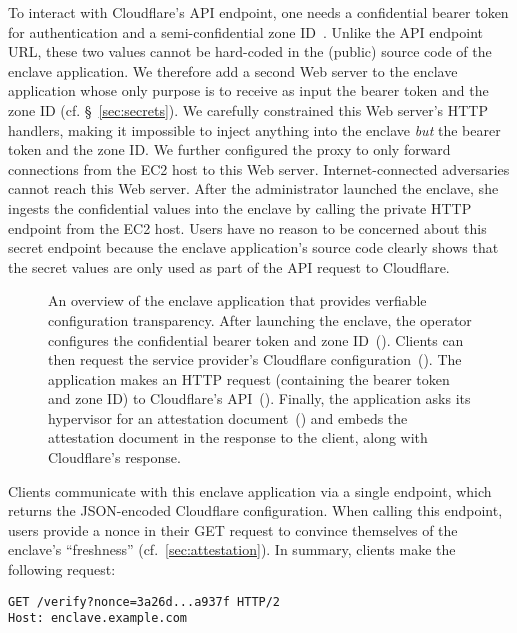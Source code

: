 To interact with Cloudflare's API endpoint, one needs a confidential bearer
token for authentication and a semi-confidential zone
ID~\cite{spectrum-config}.  Unlike the API endpoint URL, these two values
cannot be hard-coded in the (public) source code of the enclave application.
We therefore add a second Web server to the enclave application whose only
purpose is to receive as input the bearer token and the zone ID (cf.
\S~\ref{sec:secrets}).  We carefully constrained this Web server's HTTP
handlers, making it impossible to inject anything into the enclave \emph{but}
the bearer token and the zone ID.  We further configured the proxy to only
forward connections from the EC2 host to this Web server.  Internet-connected
adversaries cannot reach this Web server.  After the administrator launched the
enclave, she ingests the confidential values into the enclave by calling the
private HTTP endpoint from the EC2 host.  Users have no reason to be concerned
about this secret endpoint because the enclave application's source code
clearly shows that the secret values are only used as part of the API request
to Cloudflare.

\begin{figure}[t]
  \centering
  
  \caption{An overview of the enclave application that provides verfiable
  configuration transparency.  After launching the enclave, the operator
  configures the confidential bearer token and zone ID~().  Clients
  can then request the service provider's Cloudflare
  configuration~().  The application makes an HTTP request (containing
  the bearer token and zone ID) to Cloudflare's API~().  Finally, the
  application asks its hypervisor for an attestation document~() and
  embeds the attestation document in the response to the client, along with
  Cloudflare's response.}%
  \label{fig:vct}
\end{figure}

Clients communicate with this enclave application via a single endpoint, which
returns the JSON-encoded Cloudflare configuration.  When calling this endpoint,
users provide a nonce in their GET request to convince themselves of the
enclave's ``freshness'' (cf.~\ref{sec:attestation}).  In summary, clients make
the following request:


\begin{lstlisting}[numbers=none,basicstyle=\small\ttfamily]
GET /verify?nonce=3a26d...a937f HTTP/2
Host: enclave.example.com
\end{lstlisting}

